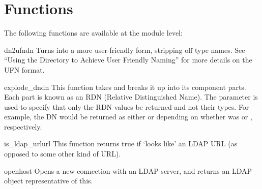 

\section{Functions}

The following functions are available at the module level:


\begin{funcdesc}{dn2ufn}{dn} %
Turns  into a more user-friendly form, stripping off type names.
See  ``Using the Directory to Achieve User Friendly Naming''
for more details on the UFN format.
\end{funcdesc}


\begin{funcdesc}{explode_dn}{dn } %
This function takes  and breaks it up into its component parts. 
Each part is known as an RDN (Relative Distinguished Name). The
 parameter is used to specify that only the RDN values be returned
and not their types. For example, the DN  would be
returned as either \code{["cn=Bob", "c=US"]} or \code{["Bob","US"]}
depending on whether  was  or , respectively.
\end{funcdesc}


\begin{funcdesc}{is_ldap_url}{url} %
This function returns true if  `looks like' an LDAP URL 
(as opposed to some other kind of URL). 
\end{funcdesc}


\begin{funcdesc}{open}{host } %
Opens a new connection with an LDAP server, and returns an LDAP object
representative of this.
\end{funcdesc}
